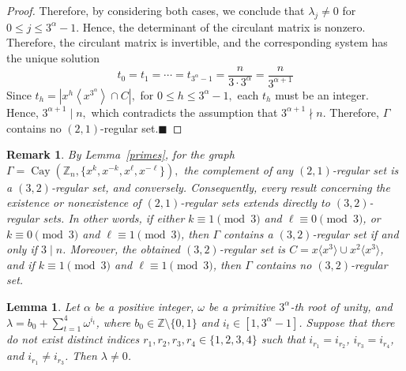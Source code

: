 \documentclass[12pt]{article}
\newtheorem{lemA}[propA]{Lemma}
\newtheorem{remA}[propA]{Remark}
\begin{document}
\begin{proof}
Therefore, by considering both cases, we conclude that
$
\lambda_j\neq0$ for $0\le j\le3^{\alpha}-1.
$
Hence, the determinant of the circulant matrix is nonzero. Therefore, the circulant matrix is invertible, and the corresponding system has the unique solution
\[
t_0=t_1=\cdots=t_{3^{\alpha}-1}
=\frac{n}{3\cdot3^{\alpha}}
=\frac{n}{3^{\alpha+1}}
\]
Since
$
t_h=\left|x^h\left\langle x^{3^{\alpha}}\right\rangle\cap C\right|,$ for
$0\le h\le3^{\alpha}-1,
$
each \(t_h\) must be an integer. Hence,
$
3^{\alpha+1}\mid n,
$
which contradicts the assumption that
$
3^{\alpha+1}\nmid n.
$
Therefore, \(\Gamma\) contains no \((2,1)\)-regular set.\hfill$\blacksquare$
 	\end{proof}
\begin{remA}\label{rem:32}
	By Lemma~\ref{primes}, for the graph $\Gamma=\operatorname{Cay}(\mathbb{Z}_n,\{x^k,x^{-k},x^\ell,x^{-\ell}\}),$
	the complement of any \((2,1)\)-regular set is a \((3,2)\)-regular set, and conversely. Consequently, every result concerning the existence or nonexistence of \((2,1)\)-regular sets extends directly to \((3,2)\)-regular sets. In other words, if either \(k\equiv 1 \pmod{3}\) and \(\ell\equiv 0 \pmod{3}\), or \(k\equiv 0 \pmod{3}\) and \(\ell\equiv 1 \pmod{3}\), then \(\Gamma\) contains a \((3,2)\)-regular set if and only if \(3\mid n\). Moreover, the obtained \((3,2)\)-regular set is \(C=x\langle x^3\rangle \cup x^2\langle x^3\rangle\), and if \(k\equiv 1 \pmod{3}\) and \(\ell\equiv 1 \pmod{3}\), then \(\Gamma\) contains no \((3,2)\)-regular set.
	\end{remA}	
\begin{lemA}\label{lemb_3}
Let $\alpha$ be a positive integer, $\omega$ be a primitive $3^\alpha$-th root of unity, and $\lambda=b_0+\sum_{t=1}^{4}\omega^{i_t}$, where $b_0\in\mathbb{Z}\setminus\{0,1\}$ and $i_t\in[1,3^\alpha-1]$. Suppose that there do not exist distinct indices $r_1,r_2,r_3,r_4\in\{1,2,3,4\}$ such that $i_{r_1}=i_{r_2}$, $i_{r_3}=i_{r_4}$, and $i_{r_1}\neq i_{r_3}$. Then $\lambda\neq0$.
\end{lemA} 	
\end{document}

